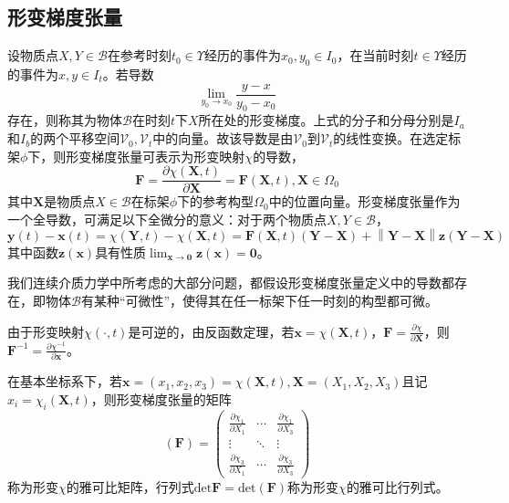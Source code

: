 \documentclass[main.tex]{subfiles}
\begin{document}
\subsection{形变梯度张量}
设物质点$X,Y\in\mathcal{B}$在参考时刻$t_0\in\Upsilon$经历的事件为$x_0,y_0\in I_0$，在当前时刻$t\in\Upsilon$经历的事件为$x,y\in I_t$。若导数
\[\lim_{y_0\to x_0}\frac{y-x}{y_0-x_0}\]
存在，则称其为物体$\mathcal{B}$在时刻$t$下$X$所在处的形变梯度。上式的分子和分母分别是$I_a$和$I_b$的两个平移空间$\mathcal{V}_0,\mathcal{V}_t$中的向量。故该导数是由$\mathcal{V}_0$到$\mathcal{V}_t$的线性变换。在选定标架$\phi$下，则形变梯度张量可表示为形变映射$\chi$的导数，
\[\mathbf{F}=\frac{\partial\chi\left(\mathbf{X},t\right)}{\partial\mathbf{X}}=\mathbf{F}\left(\mathbf{X},t\right),\mathbf{X}\in\Omega_0
\]
其中$\mathbf{X}$是物质点$X\in\mathcal{B}$在标架$\phi$下的参考构型$\Omega_0$中的位置向量。形变梯度张量作为一个全导数，可满足以下全微分的意义：对于两个物质点$X,Y\in\mathcal{B}$，
\[\mathbf{y}\left(t\right)-\mathbf{x}\left(t\right)=\chi\left(\mathbf{Y},t\right)-\chi\left(\mathbf{X},t\right)=\mathbf{F}\left(\mathbf{X},t\right)\left(\mathbf{Y}-\mathbf{X}\right)+\left\|\mathbf{Y}-\mathbf{X}\right\|\mathbf{z}\left(\mathbf{Y}-\mathbf{X}\right)\]
其中函数$\mathbf{z}\left(\mathbf{x}\right)$具有性质$\lim_{\mathbf{x}\to\mathbf{0}}\mathbf{z}\left(\mathbf{x}\right)=\mathbf{0}$。

我们连续介质力学中所考虑的大部分问题，都假设形变梯度张量定义中的导数都存在，即物体$\mathcal{B}$有某种“可微性”，使得其在任一标架下任一时刻的构型都可微。

由于形变映射$\chi\left(\cdot,t\right)$是可逆的，由反函数定理，若$\mathbf{x}=\chi\left(\mathbf{X},t\right)$，$\mathbf{F}=\frac{\partial\chi}{\partial\mathbf{X}}$，则$\mathbf{F}^{-1}=\frac{\partial\chi^{-1}}{\partial\mathbf{x}}$。

在基本坐标系下，若$\mathbf{x}=\left(x_1,x_2,x_3\right)=\chi\left(\mathbf{X},t\right),\mathbf{X}=\left(X_1,X_2,X_3\right)$且记$x_i=\chi_i\left(\mathbf{X},t\right)$，则形变梯度张量的矩阵
\[
\left(\mathbf{F}\right)=\left(\begin{array}{ccc}
\frac{\partial\chi_1}{\partial X_1}&\cdots&\frac{\partial\chi_1}{\partial X_3}\\
\vdots&\ddots&\vdots\\
\frac{\partial\chi_3}{\partial X_1}&\cdots&\frac{\partial\chi_3}{\partial X_3}
\end{array}\right)\]
称为形变$\chi$的雅可比矩阵，行列式$\mathrm{det}\mathbf{F}=\mathrm{det}\left(\mathbf{F}\right)$称为形变$\chi$的雅可比行列式。
\end{document}
